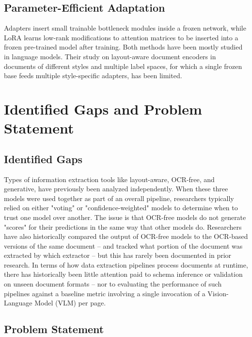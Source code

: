 \documentclass[conference]{IEEEtran}
\begin{document}
\subsection{Parameter-Efficient Adaptation}

Adapters \cite{houlsby2019adapters} insert small trainable bottleneck modules inside a frozen network, while LoRA \cite{hu2022lora} learns low-rank modifications to attention matrices to be inserted into a frozen pre-trained model after training. Both methods have been mostly studied in language models. Their study on layout-aware document encoders in documents of different styles and multiple label spaces, for which a single frozen base feeds multiple style-specific adapters, has been limited.

\section{Identified Gaps and Problem Statement}
\label{sec:gaps}

\subsection{Identified Gaps}

Types of information extraction tools like layout-aware, OCR-free, and generative, have previously been analyzed independently. When these three models were used together as part of an overall pipeline, researchers typically relied on either "voting" or "confidence-weighted" models to determine when to trust one model over another. The issue is that OCR-free models do not generate "scores" for their predictions in the same way that other models do. Researchers have also historically compared the output of OCR-free models to the OCR-based versions of the same document -- and tracked what portion of the document was extracted by which extractor -- but this has rarely been documented in prior research. In terms of how data extraction pipelines process documents at runtime, there has historically been little attention paid to schema inference or validation on unseen document formats -- nor to evaluating the performance of such pipelines against a baseline metric involving a single invocation of a Vision-Language Model (VLM) per page.

\subsection{Problem Statement}
\end{document}
